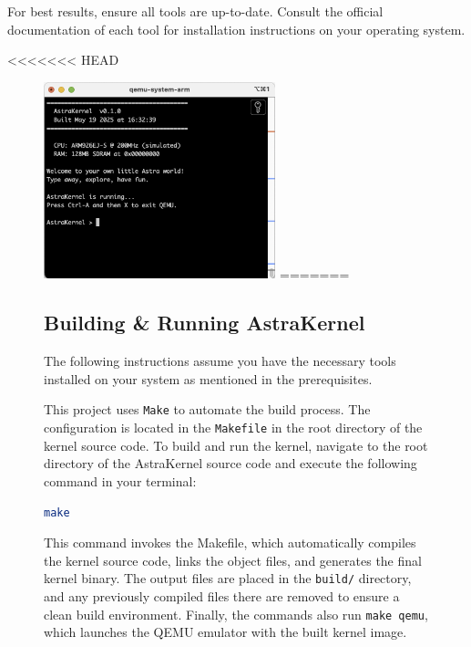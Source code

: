\noindent
For best results, ensure all tools are up-to-date. Consult the official documentation 
of each tool for installation instructions on your operating system.

<<<<<<< HEAD
\begin{figure}[!ht]
  \centering
  \includegraphics[width=0.6\textwidth]{figures/bootedKernel.png}
=======
\subsection{Building \& Running AstraKernel}

\begin{note}
  The following instructions assume you have the necessary tools installed on your 
  system as mentioned in the prerequisites.
\end{note}

This project uses \texttt{Make} to automate the build process. The configuration
is located in the \texttt{Makefile} in the root directory of the kernel source code.
To build and run the kernel, navigate to the root directory of the AstraKernel source code
and execute the following command in your terminal: \\

\begin{lstlisting}[language={bash}, caption={Building AstraKernel.}, label={lst:build}]
make
\end{lstlisting}

\noindent
This command invokes the Makefile, which automatically compiles the kernel 
source code, links the object files, and generates the final kernel binary. The 
output files are placed in the \texttt{build/} directory, and any previously 
compiled files there are removed to ensure a clean build environment. Finally, 
the commands also run \texttt{make qemu}, which launches the QEMU emulator with the 
built kernel image. \\


\end{figure}
